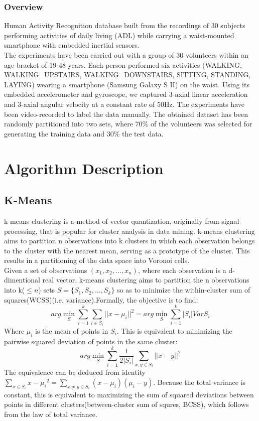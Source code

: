 \documentclass{article}
\begin{document}
\subsubsection{Overview}
Human Activity Recognition database built from the recordings of 30 subjects performing activities of daily living (ADL) while carrying a waist-mounted smartphone with embedded inertial sensors.\\
The experiments have been carried out with a group of 30 volunteers within an age bracket of 19-48 years. Each person performed six activities (WALKING, WALKING\_UPSTAIRS, WALKING\_DOWNSTAIRS, SITTING, STANDING, LAYING) wearing a smartphone (Samsung Galaxy S II) on the waist. Using its embedded accelerometer and gyroscope, we captured 3-axial linear acceleration and 3-axial angular velocity at a constant rate of 50Hz. The experiments have been video-recorded to label the data manually. The obtained dataset has been randomly partitioned into two sets, where 70$\%$ of the volunteers was selected for generating the training data and 30$\%$ the test data.




\section{Algorithm Description}
\subsection{K-Means}
k-means clustering is a method of vector quantization, originally from signal processing, that is popular for cluster analysis in data mining. k-means clustering aims to partition n observations into k clusters in which each observation belongs to the cluster with the nearest mean, serving as a prototype of the cluster. This results in a partitioning of the data space into Voronoi cells.\\
Given a set of observations $(x_1,x_2,\dots,x_n)$, where each observation is a d-dimentional real vector, k-means clustering aims to partition the n observations into k($\leq n$) sets $S=\{S_1,S_2,\dots,S_k\}$ so as to minimize the within-cluster sum of squares(WCSS)(i.e. variance).Formally, the objective is to find:
$$arg\min\limits_S \sum_{i=1}^k \sum_{i\in S_i} {||x-\mu_i||}^2=arg\min\limits_S \sum_{i=1}^k |S_i|Var S_i$$
Where $\mu_i$ is the mean of points in $S_i$. This is equivalent to minimizing the pairwise squared deviation of points in the same cluster:
$$arg\min\limits_S \sum_{i=1}^k \frac{1}{2|S_i|}\sum_{x,y\in S_i}{||x-y||}^2$$
The equivalence can be deduced from identity $\sum\limits_{x\in S_i}{x-\mu_i}^2=\sum\limits_{x\neq y\in S_i}(x-\mu_i)(\mu_i-y)$. Because the total variance is constant, this is equivalent to maximizing the sum of squared deviations between points in different clusters(between-cluster sum of squres, BCSS), which follows from the law of total variance.
\end{document}
